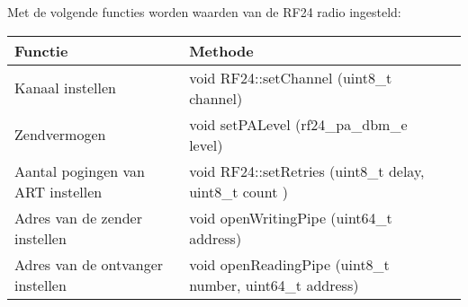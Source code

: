 \documentclass{article}
\begin{document}
Met de volgende functies worden waarden van de RF24 radio ingesteld:
\\
\begin{tabular}{ | l | l | p{5cm} |}
    \hline
    Functie				& Methode	\\ \hline
    Kanaal instellen			& void RF24::setChannel	(uint8\_t channel) 	\\ 
    Zendvermogen 	& void 	setPALevel (rf24\_pa\_dbm\_e level)	\\ 
    Aantal pogingen van ART instellen				& void RF24::setRetries	(uint8\_t delay, uint8\_t count )				\\ 
    Adres van de zender instellen 		&  	void 	openWritingPipe (uint64\_t address)	\\
    Adres van de ontvanger instellen & 
void 	openReadingPipe (uint8\_t number, uint64\_t address) \\ \hline
    \end{tabular}\\
\end{document}
